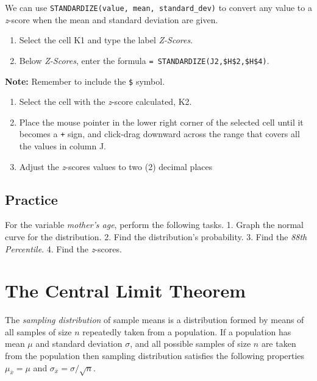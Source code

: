 \documentclass[
  12pt,
  letterpaper,
]{book}
\providecommand{\tightlist}{%
  \setlength{\itemsep}{0pt}\setlength{\parskip}{0pt}}
\begin{document}
We can use \texttt{STANDARDIZE(value,\ mean,\ standard\_dev)} to convert any value to a \emph{z}-score when the mean and standard deviation are given.

\begin{enumerate}
\def\labelenumi{\arabic{enumi}.}
\tightlist
\item
  Select the cell K1 and type the label \emph{Z-Scores}.
\item
  Below \emph{Z-Scores}, enter the formula \texttt{=\ STANDARDIZE(J2,\$H\$2,\$H\$4)}.
\end{enumerate}

\textbf{Note:} Remember to include the \texttt{\$} symbol.

\begin{enumerate}
\def\labelenumi{\arabic{enumi}.}
\setcounter{enumi}{2}
\tightlist
\item
  Select the cell with the \emph{z}-score calculated, K2.
\item
  Place the mouse pointer in the lower right corner of the selected cell until it becomes a \texttt{+} sign, and click-drag downward across the range that covers all the values in column J.
\item
  Adjust the \emph{z}-scores values to two (2) decimal places
\end{enumerate}

\hypertarget{practice-9}{%
\section{Practice}\label{practice-9}}

For the variable \emph{mother's age}, perform the following tasks.
1. Graph the normal curve for the distribution.
2. Find the distribution's probability.
3. Find the \emph{88th Percentile}.
4. Find the \emph{z}-scores.

\hypertarget{the-central-limit-theorem}{%
\chapter{The Central Limit Theorem}\label{the-central-limit-theorem}}

The \emph{sampling distribution} of sample means is a distribution formed by means of all samples of size \(n\) repeatedly taken from a population. If a population has mean \(\mu\) and standard deviation \(\sigma\), and all possible samples of size \(n\) are taken from the population then sampling distribution satisfies the following properties \(\mu_{\bar{x}}=\mu\) and \(\sigma_{\bar{x}}=\sigma/\sqrt{n}\).
\end{document}
